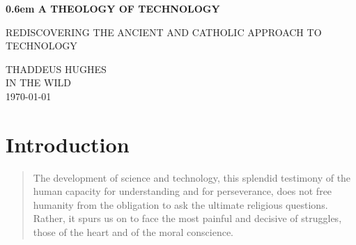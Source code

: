 \documentclass[letterpaper]{article}
\begin{document}
\clearpage
\newcommand\nbvspace[1][3]{\vspace*{\stretch{#1}}}

\newcommand{\nbstretchyspace}{\spaceskip0.5em plus 0.25em minus 0.25em}

\newcommand{\nbtitlestretch}{\spaceskip0.6em}
\thispagestyle{empty}
\pagestyle{plain}
\begin{center}
  \bfseries
  \nbvspace[1]
  \Huge
  {\nbtitlestretch\huge
    A THEOLOGY OF TECHNOLOGY}

  \nbvspace[1]
  \normalsize
  REDISCOVERING THE ANCIENT AND CATHOLIC APPROACH TO TECHNOLOGY\\

  \nbvspace[1]
  \nbvspace[2]

  \nbvspace[3]
  \normalsize

  \Large THADDEUS HUGHES\\


  \large
  IN THE WILD \\
  \small \MakeUppercase{\today} \\
\end{center}

\raggedbottom

\clearpage
\setcounter{page}{1}

\tableofcontents

\newpage



\section{Introduction}

\begin{quote}
  The development of science and technology, this splendid testimony of the human capacity for understanding and for perseverance, does not free humanity from the obligation to ask the ultimate religious questions. Rather, it spurs us on to face the most painful and decisive of struggles, those of the heart and of the moral conscience.
\end{quote}
\end{document}
